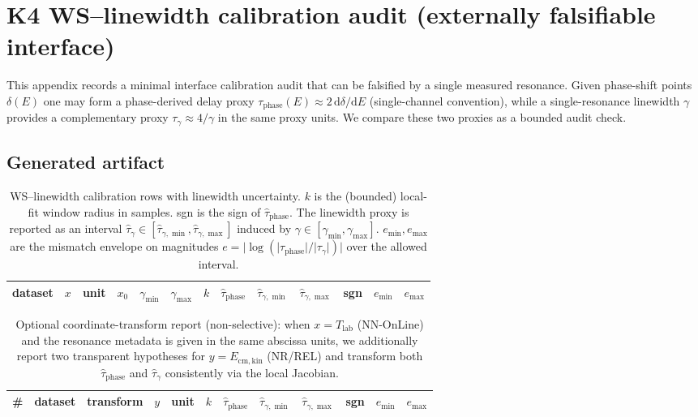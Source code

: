 \section{K4 WS--linewidth calibration audit (externally falsifiable interface)}
\label{app:k4_ws_linewidth_audit}

\AuditTag This appendix records a minimal interface calibration audit that can be falsified by a single measured resonance.
Given phase-shift points $\delta(E)$ one may form a phase-derived delay proxy $\tau_{\mathrm{phase}}(E)\approx 2\,\mathrm{d}\delta/\mathrm{d}E$ (single-channel convention), while a single-resonance linewidth $\gamma$ provides a complementary proxy $\tau_{\gamma}\approx 4/\gamma$ in the same proxy units.
We compare these two proxies as a bounded audit check.

\subsection{Generated artifact}
\begin{table}[h]
\centering
\small
\begin{tabular}{l l l r r r r r r r r r r}
\toprule
dataset & $x$ & unit & $x_0$ & $\gamma_{\min}$ & $\gamma_{\max}$ & $k$ & $\widehat{\tau}_{\mathrm{phase}}$ & $\widehat{\tau}_{\gamma,\min}$ & $\widehat{\tau}_{\gamma,\max}$ & sgn & $e_{\min}$ & $e_{\max}$ \\
\midrule
%
\end{tabular}
\caption{WS--linewidth calibration rows with linewidth uncertainty. $k$ is the (bounded) local-fit window radius in samples. sgn is the sign of $\widehat{\tau}_{\mathrm{phase}}$. The linewidth proxy is reported as an interval $\widehat{\tau}_{\gamma}\in[\widehat{\tau}_{\gamma,\min},\widehat{\tau}_{\gamma,\max}]$ induced by $\gamma\in[\gamma_{\min},\gamma_{\max}]$. $e_{\min},e_{\max}$ are the mismatch envelope on magnitudes $e=\lvert\log(\lvert\tau_{\mathrm{phase}}\rvert/\lvert\tau_{\gamma}\rvert)\rvert$ over the allowed interval.}
\end{table}

\begin{table}[h]
\centering
\small
\begin{tabular}{r l l l l r r r r r r r}
\toprule
\# & dataset & transform & $y$ & unit & $k$ & $\widehat{\tau}_{\mathrm{phase}}$ & $\widehat{\tau}_{\gamma,\min}$ & $\widehat{\tau}_{\gamma,\max}$ & sgn & $e_{\min}$ & $e_{\max}$ \\
\midrule
%
\end{tabular}
\caption{Optional coordinate-transform report (non-selective): when $x=T_{\mathrm{lab}}$ (NN-OnLine) and the resonance metadata is given in the same abscissa units, we additionally report two transparent hypotheses for $y=E_{\mathrm{cm,kin}}$ (NR/REL) and transform both $\widehat{\tau}_{\mathrm{phase}}$ and $\widehat{\tau}_{\gamma}$ consistently via the local Jacobian.}
\end{table}



